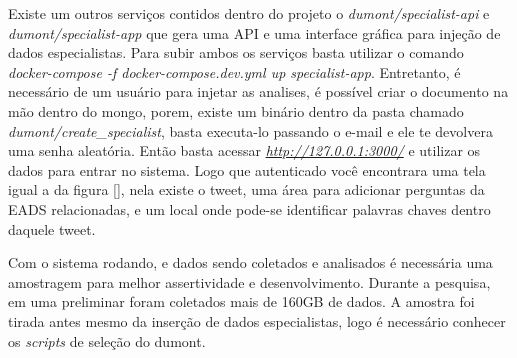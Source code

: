 Existe um outros serviços contidos dentro do projeto o \textit{dumont/specialist-api} e \textit{dumont/specialist-app} que gera uma API e uma interface gráfica para injeção de dados especialistas. Para subir ambos os serviços basta utilizar o comando \textit{docker-compose -f docker-compose.dev.yml up specialist-app}. Entretanto, é necessário de um usuário para injetar as analises, é possível criar o documento na mão dentro do mongo, porem, existe um binário dentro da pasta chamado \textit{dumont/create\_specialist}, basta executa-lo passando o e-mail e ele te devolvera uma senha aleatória. Então basta acessar \textit{\url{http://127.0.0.1:3000/}} e utilizar os dados para entrar no sistema. Logo que autenticado você encontrara uma tela igual a da figura \ref{}, nela existe o tweet, uma área para adicionar perguntas da EADS relacionadas, e um local onde pode-se identificar palavras chaves dentro daquele tweet.

Com o sistema rodando, e dados sendo coletados e analisados é necessária uma amostragem para melhor assertividade e desenvolvimento. Durante a pesquisa, em uma preliminar foram coletados mais de 160GB de dados. A amostra foi tirada antes mesmo da inserção de dados especialistas, logo é necessário conhecer os \textit{scripts} de seleção do dumont.
